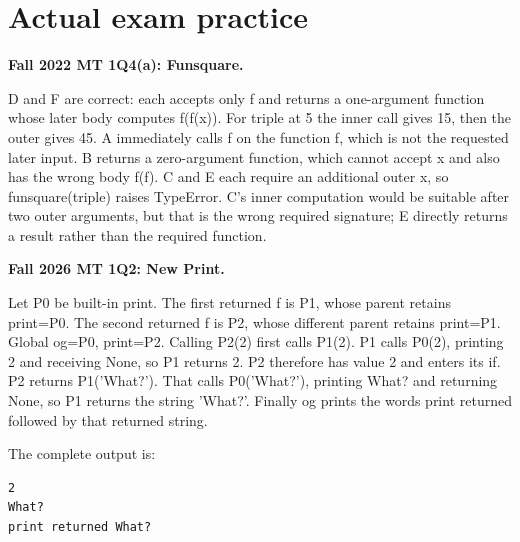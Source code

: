 \documentclass[10pt]{scrartcl}
\begin{document}
\section{Actual exam practice}
\begin{prob}
\textbf{Fall 2022 MT 1Q4(a): Funsquare.} 
\begin{steps}
\ii D and F are correct: each accepts only f and returns a one-argument function whose later body computes f(f(x)). For triple at 5 the inner call gives 15, then the outer gives 45.
\ii A immediately calls f on the function f, which is not the requested later input. B returns a zero-argument function, which cannot accept x and also has the wrong body f(f).
\ii C and E each require an additional outer x, so funsquare(triple) raises TypeError. C's inner computation would be suitable after two outer arguments, but that is the wrong required signature; E directly returns a result rather than the required function.
\end{steps}
\end{prob}
\begin{prob}
\textbf{Fall 2026 MT 1Q2: New Print.} 
\begin{steps}
\ii Let P0 be built-in print. The first returned f is P1, whose parent retains print=P0. The second returned f is P2, whose different parent retains print=P1. Global og=P0, print=P2.
\ii Calling P2(2) first calls P1(2). P1 calls P0(2), printing 2 and receiving None, so P1 returns 2. P2 therefore has value 2 and enters its if.
\ii P2 returns P1('What?'). That calls P0('What?'), printing What? and returning None, so P1 returns the string 'What?'. Finally og prints the words print returned followed by that returned string.
\end{steps}
\begin{fig}
\end{fig}
The complete output is:
\begin{verbatim}
2
What?
print returned What?
\end{verbatim}
\end{prob}
\end{document}
